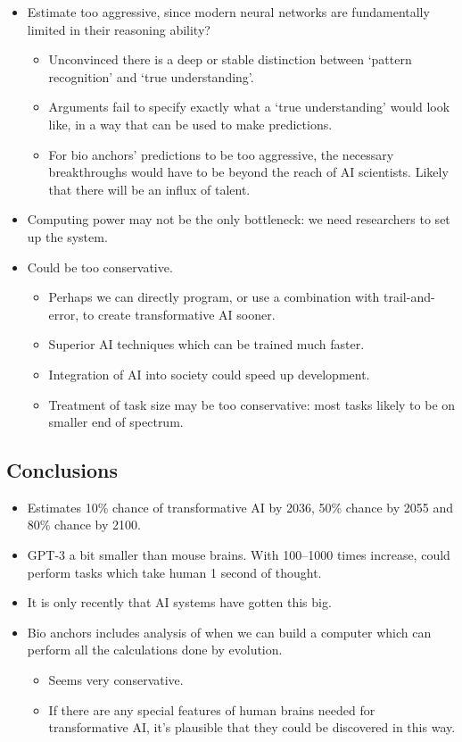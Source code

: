 \begin{itemize}
    \item Estimate too aggressive, since modern neural networks are fundamentally limited in their reasoning ability?
    \begin{itemize}
        \item Unconvinced there is a deep or stable distinction between `pattern recognition' and `true understanding'.
        \item Arguments fail to specify exactly what a `true understanding' would look like, in a way that can be used to make predictions.
        \item For bio anchors' predictions to be too aggressive, the necessary breakthroughs would have to be beyond the reach of AI scientists. Likely that there will be an influx of talent.
    \end{itemize}
    \item Computing power may not be the only bottleneck: we need researchers to set up the system.
    \item Could be too conservative.
    \begin{itemize}
        \item Perhaps we can directly program, or use a combination with trail-and-error, to create transformative AI sooner.
        \item Superior AI techniques which can be trained much faster.
        \item Integration of AI into society could speed up development.
        \item Treatment of task size may be too conservative: most tasks likely to be on smaller end of spectrum.
    \end{itemize}
\end{itemize}


\subsection{Conclusions}

\begin{itemize}
    \item Estimates 10\% chance of transformative AI by 2036, 50\% chance by 2055 and 80\% chance by 2100.
    \item GPT-3 a bit smaller than mouse brains. With 100–1000 times increase, could perform tasks which take human 1 second of thought.
    \item It is only recently that AI systems have gotten this big.
    \item Bio anchors includes analysis of when we can build a computer which can perform all the calculations done by evolution.
    \begin{itemize}
        \item Seems very conservative.
        \item If there are any special features of human brains needed for transformative AI, it's plausible that they could be discovered in this way.
    \end{itemize}
\end{itemize}


